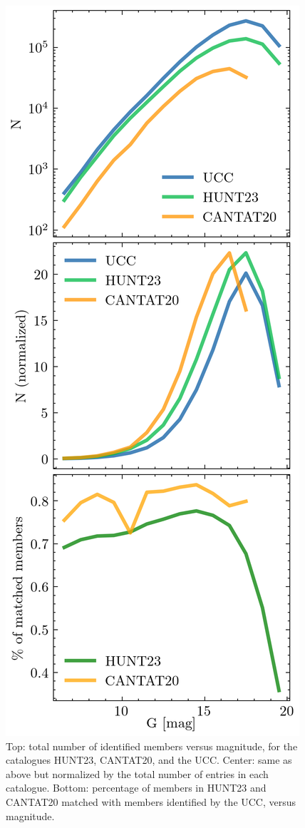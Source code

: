 \documentclass[fleqn,usenatbib]{mnras}
\begin{document}
\begin{figure}
	\includegraphics[width=\columnwidth]{figs/membs_compare.png}
    \caption{Top: total number of identified members versus magnitude, for
    the catalogues HUNT23, CANTAT20, and the UCC.
    Center: same as above but normalized by the total number of entries in each
    catalogue.
    Bottom: percentage of members in HUNT23 and CANTAT20 matched with members
    identified by the UCC, versus magnitude.}
    \label{fig:members}
\end{figure}
\end{document}
